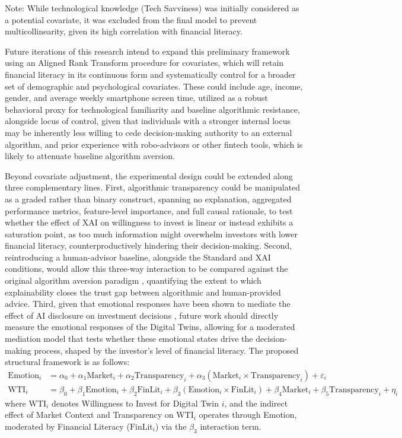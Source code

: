 \documentclass[10pt, a4paper]{article} %
\begin{document}
Note: While technological knowledge (Tech Savviness) was initially considered as a potential covariate, it was excluded from the final model to prevent multicollinearity, given its high correlation with financial literacy.

Future iterations of this research intend to expand this preliminary framework using an Aligned Rank Transform procedure for covariates, which will retain financial literacy in its continuous form and systematically control for a broader set of demographic and psychological covariates. These could include age, income, gender, and average weekly smartphone screen time, utilized as a robust behavioral proxy for technological familiarity and baseline algorithmic resistance, alongside locus of control, given that individuals with a stronger internal locus may be inherently less willing to cede decision-making authority to an external algorithm, and prior experience with robo-advisors or other fintech tools, which is likely to attenuate baseline algorithm aversion.

Beyond covariate adjustment, the experimental design could be extended along three complementary lines. First, algorithmic transparency could be manipulated as a graded rather than binary construct, spanning no explanation, aggregated performance metrics, feature-level importance, and full causal rationale, to test whether the effect of XAI on willingness to invest is linear or instead exhibits a saturation point, as too much information might overwhelm investors with lower financial literacy, counterproductively hindering their decision-making. Second, reintroducing a human-advisor baseline, alongside the Standard and XAI conditions, would allow this three-way interaction to be compared against the original algorithm aversion paradigm \citep{dietvorst2015algorithm}, quantifying the extent to which explainability closes the trust gap between algorithmic and human-provided advice. Third, given that emotional responses have been shown to mediate the effect of AI disclosure on investment decisions \citep{Downen2024Algorithm}, future work should directly measure the emotional responses of the Digital Twins, allowing for a moderated mediation model that tests whether these emotional states drive the decision-making process, shaped by the investor's level of financial literacy. The proposed structural framework is as follows:
\begin{align}
\text{Emotion}_i &= \alpha_0 + \alpha_1 \text{Market}_i + \alpha_2 \text{Transparency}_i + \alpha_3 (\text{Market}_i \times \text{Transparency}_i) + \varepsilon_i \\
\text{WTI}_i &= \beta_0 + \beta_1 \text{Emotion}_i + \beta_2 \text{FinLit}_i + \beta_3 (\text{Emotion}_i \times \text{FinLit}_i) + \beta_4 \text{Market}_i + \beta_5 \text{Transparency}_i + \eta_i
\end{align}
where $\text{WTI}_i$ denotes Willingness to Invest for Digital Twin $i$, and the indirect effect of Market Context and Transparency on $\text{WTI}_i$ operates through Emotion, moderated by Financial Literacy ($\text{FinLit}_i$) via the $\beta_3$ interaction term.
\end{document}
